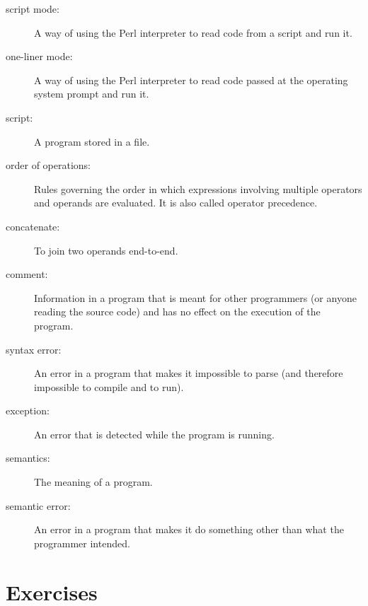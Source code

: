 \begin{description}
\item[script mode:] A way of using the Perl interpreter to read
code from a script and run it.

\item[one-liner mode:] A way of using the Perl interpreter to read
code passed at the operating system prompt and run it.

\item[script:] A program stored in a file.

\item[order of operations:]  Rules governing the order in which
expressions involving multiple operators and operands are evaluated.
It is also called operator precedence.

\item[concatenate:]  To join two operands end-to-end.

\item[comment:]  Information in a program that is meant for other
programmers (or anyone reading the source code) and has no effect on the
execution of the program.

\item[syntax error:]  An error in a program that makes it impossible
to parse (and therefore impossible to compile and to run).

\item[exception:]  An error that is detected while the program is running.

\item[semantics:]  The meaning of a program.

\item[semantic error:]   An error in a program that makes it do something
other than what the programmer intended.

\end{description}


\section{Exercises}

